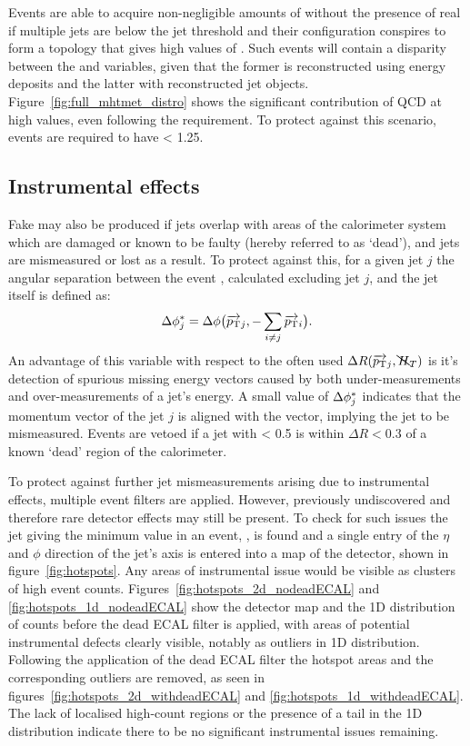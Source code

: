 Events are able to acquire non-negligible amounts of \mht without the presence
of
real \met if multiple jets are below the jet \Pt threshold and their
configuration conspires to form a topology that gives high values of \alphat.
Such events will contain a disparity between the \met and
\mht variables, given that the former is reconstructed using energy deposits
and the latter with reconstructed jet objects.
Figure~\ref{fig:full_mhtmet_distro} shows the significant contribution of QCD at
high \mhtmet values, even following the \alphat requirement.
To protect against this scenario, events are required to have \mhtmet < 1.25.


\subsection{Instrumental effects}

Fake \mht may also be produced if jets overlap with areas of the calorimeter 
system which are damaged or known to be faulty (hereby referred to as `dead'),
and jets are mismeasured or lost as a result. To protect against this, for a
given jet $j$ the angular separation between the event \mht, calculated
excluding jet $j$, and the jet itself is defined as:
% 
\begin{equation}
\Delta \phi^*_j = \Delta \phi\big(\overrightarrow{{p_{\text T}}}_j,-\sum_{i\neq j}
{\overrightarrow{{p_{\text T}}}_i}\big) .
\label{eq:biasdphi}
\end{equation}
% 
An advantage of this variable with respect to the often used
$\Delta R(\overrightarrow{{p_{\text T}}}_j, \bcancel{H}_T)$ is it's detection of spurious missing
energy vectors
caused
by both under-measurements and over-measurements of a jet's energy.
A small value of $\Delta \phi^*_j$ indicates that the momentum vector of the jet $j$
is aligned with the \mht vector, implying the jet to be mismeasured. Events are
vetoed if a jet with \dphistar< 0.5 is within $\Delta R < 0.3$ of a known
`dead' region of the calorimeter.

To protect against further jet mismeasurements arising due to
instrumental effects, multiple event filters are applied. However, previously
undiscovered and therefore rare detector effects may still be
present. To check for such issues the
jet giving the minimum \dphistar value in an event, \mindphistar, is found
and a single entry of the $\eta$ and $\phi$ direction of the jet's axis is entered
into a map of the detector, shown in figure~\ref{fig:hotspots}. Any areas of
instrumental issue would
be visible as clusters of high event counts.
Figures~\ref{fig:hotspots_2d_nodeadECAL} and \ref{fig:hotspots_1d_nodeadECAL}
show the detector map and the 1D distribution
of counts before the dead ECAL filter is applied, with areas of
potential instrumental defects clearly visible, notably as outliers in
1D distribution. Following the application of the dead
ECAL filter the hotspot areas and the corresponding outliers are removed, as
seen in figures~\ref{fig:hotspots_2d_withdeadECAL} and
\ref{fig:hotspots_1d_withdeadECAL}. The lack of localised high-count regions or
the presence of a tail in the 1D distribution indicate there to be
no significant instrumental issues remaining.

